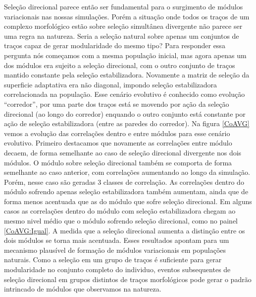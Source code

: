 Seleção direcional parece então ser fundamental para o surgimento de
módulos variacionais nas nossas simulações. 
Porém a situação onde todos os traços de um complexo morfológico estão
sobre seleção simultânea divergente não parece ser uma regra na
natureza. 
Seria a seleção natural sobre apenas um conjuntos de traços capaz de
gerar modularidade do mesmo tipo?
Para responder essa pergunta nós começamos com a mesma população
inicial, mas agora apenas um dos módulos era sujeito a seleção
direcional, com o outro conjunto de traços mantido constante pela
seleção estabilizadora. 
Novamente a matriz de seleção da superficie adaptativa era não diagonal,
impondo seleção estabilizadora correlacionada na população.
Esse cenário evolutivo é conhecido como evolução ``corredor'', por uma
parte dos traços está se movendo por ação da seleção direcional (ao
longo do corredor) enquando o outro conjunto está constante por ação de
seleção estabilizadora (entre as paredes do corredor). 
Na figura \ref{CoAVG} vemos a evolução das correlações dentro e entre
módulos para esse cenário evolutivo. 
Primeiro destacamos que novamente as correlações entre módulo decaem, de
forma semelhante ao caso de seleção direcional divergente nos dois
módulos. 
O módulo sobre seleção direcional também se comporta de forma semelhante
ao caso anterior, com correlações aumentando ao longo da simulação. 
Porém, nesse caso são geradas 3 classes de correlação. 
As correlações dentro do módulo sofrendo apenas seleção estabilizadora
também aumentam, ainda que de forma menos acentuada que as do módulo que
sofre seleção direcional. 
Em alguns casos as correlações dentro do módulo com seleção
estabilizadora chegam ao mesmo nivel médio que o módulo sofrendo seleção
direcional, como no painel \ref{CoAVG:Igual}. 
A medida que a seleção direcional aumenta a distinção entre os dois
módulos se torna mais acentuada. 
Esses resultados apontam para um mecanismo plausível de formação de
módulos variacionais em populações naturais. 
Como a seleção em um grupo de traços é suficiente para gerar
modularidade no conjunto completo do individuo, eventos subsequentes de
seleção direcional em grupos distintos de traços morfológicos pode gerar
o padrão intrincado de módulos que observamos na natureza. 

